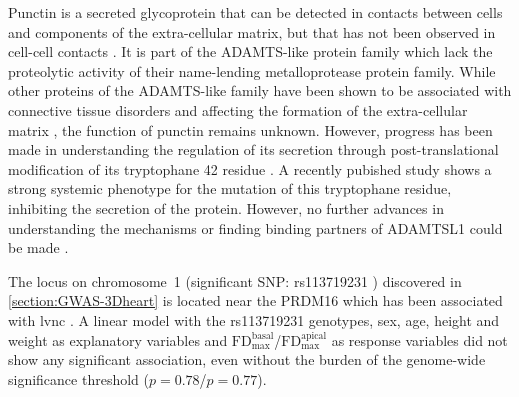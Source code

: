 %
Punctin is a secreted glycoprotein that can be detected in contacts between cells and components of the extra-cellular matrix, but that has not been observed in cell-cell contacts \citep{Hirohata2002}. It is part of the ADAMTS-like protein family which lack the proteolytic activity of their name-lending metalloprotease protein family. While other proteins of the ADAMTS-like family have been shown to be associated with connective tissue disorders and affecting the formation of the extra-cellular matrix \citep{Ahram2009,Hubmacher2015}, the function of punctin remains unknown. However, progress has been made in understanding the regulation of its secretion through post-translational modification of its tryptophane \num{42} residue \citep{Wang2009}. A recently pubished study shows a strong systemic phenotype for the mutation of this tryptophane residue, inhibiting the secretion of the protein. However, no further advances in understanding the mechanisms or finding binding partners of ADAMTSL1 could be made \citep{Hendee2017}.

The locus on chromosome~1 (significant SNP: rs113719231 ) discovered in \cref{section:GWAS-3Dheart} is located near the PRDM16 which has been associated with \gls{lvnc} \citep{Arndt2013}. A linear model with the rs113719231 genotypes, sex, age, height and weight as explanatory variables and \(\text{FD}_\text{max}^\text{basal}\)/\(\text{FD}_\text{max}^\text{apical}\) as response variables did not show any significant association, even without the burden of the genome-wide significance threshold (\(p = 0.78\)/\(p = 0.77\)).

